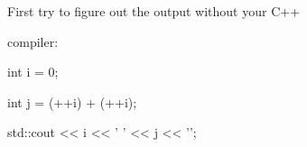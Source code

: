 First try to figure out the output without your C++

compiler:

\begin{console}

int i = 0;

int j = (++i) + (++i);

std::cout << i << ' ' << j << '\n';

\end{console}

